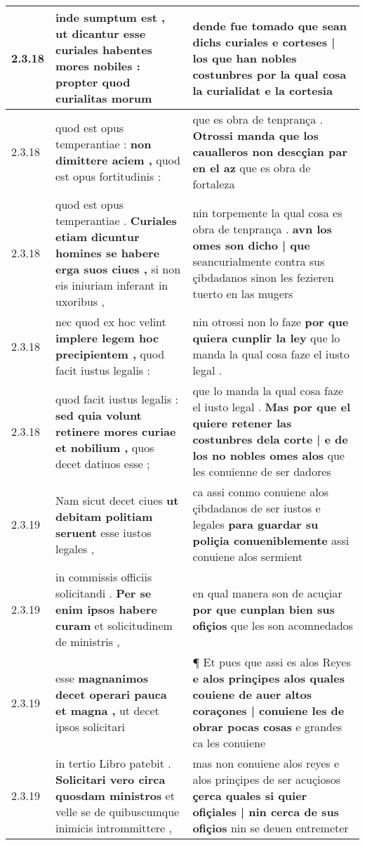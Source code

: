 \begin{tabular}{|p{1cm}|p{6.5cm}|p{6.5cm}|}
2.3.18 & inde sumptum est , \textbf{ ut dicantur esse curiales habentes mores nobiles : } propter quod curialitas morum & dende fue tomado \textbf{ que sean dichs curiales e corteses | los que han nobles costunbres } por la qual cosa la curialidat e la cortesia \\\hline
2.3.18 & quod est opus temperantiae : \textbf{ non dimittere aciem , } quod est opus fortitudinis : & que es obra de tenprança . \textbf{ Otrossi manda que los caualleros non descçian par en el az } que es obra de fortaleza \\\hline
2.3.18 & quod est opus temperantiae . \textbf{ Curiales etiam dicuntur homines se habere erga suos ciues , } si non eis iniuriam inferant in uxoribus , & nin torpemente la qual cosa es obra de tenprança . \textbf{ avn los omes son dicho | que } seancurialmente contra sus çibdadanos sinon les fezieren tuerto en las mugers \\\hline
2.3.18 & nec quod ex hoc velint \textbf{ implere legem hoc precipientem , } quod facit iustus legalis : & nin otrossi non lo faze \textbf{ por que quiera cunplir la ley } que lo manda la qual cosa faze el iusto legal . \\\hline
2.3.18 & quod facit iustus legalis : \textbf{ sed quia volunt retinere mores curiae et nobilium , } quos decet datiuos esse ; & que lo manda la qual cosa faze el iusto legal . \textbf{ Mas por que el quiere retener las costunbres dela corte | e de los no nobles omes alos } que les conuienne de ser dadores \\\hline
2.3.19 & Nam sicut decet ciues \textbf{ ut debitam politiam seruent } esse iustos legales , & ca assi conmo conuiene alos çibdadanos de ser iustos e legales \textbf{ para guardar su poliçia conueniblemente } assi conuiene alos sermient \\\hline
2.3.19 & in commissis officiis solicitandi . \textbf{ Per se enim ipsos habere curam } et solicitudinem de ministris , & en qual manera son de acuçiar \textbf{ por que cunplan bien sus ofiçios } que les son acomnedados \\\hline
2.3.19 & esse \textbf{ magnanimos decet operari pauca et magna , } ut decet ipsos solicitari & ¶ Et pues que assi es alos Reyes \textbf{ e alos prinçipes alos quales couiene de auer altos coraçones | conuiene les de obrar pocas cosas } e grandes ca les conuiene \\\hline
2.3.19 & in tertio Libro patebit . \textbf{ Solicitari vero circa quosdam ministros } et velle se de quibuscumque inimicis intrommittere , & mas non conuiene alos reyes e alos prinçipes de ser acuçiosos \textbf{ çerca quales si quier ofiçiales | nin cerca de sus ofiçios } nin se deuen entremeter \\\hline

\end{tabular}
